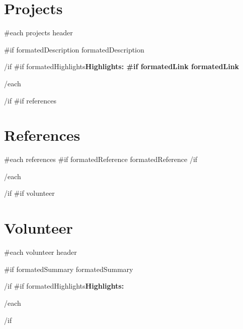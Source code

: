 \documentclass{article}
\begin{document}
\begin{paracol}{2}
\begin{rightcolumn}
\section*{Projects} {
  {{#each projects}}
    {{ header }}\par
    {{#if formatedDescription}}
      {{ formatedDescription }}
      \par
    {{/if}}
    {{#if formatedHighlights}}\bfseries Highlights: 
    {{#if formatedLink}}{{ formatedLink }}
    \par
  {{/each}}
}
{{/if}}
{{#if references}}
\section*{References} {
  {{#each references}}
    {{#if formatedReference}}{{ formatedReference }}{{/if}}
    \par
  {{/each}}
}
{{/if}}
{{#if volunteer}}
\section*{Volunteer} {
  {{#each volunteer}}
    {{ header }}\par
    {{#if formatedSummary}}
      {{ formatedSummary }}
      \par
    {{/if}}
    {{#if formatedHighlights}}\bfseries Highlights: 
    \par
  {{/each}}
}
{{/if}}

\end{rightcolumn}
\end{paracol}
\end{document}
